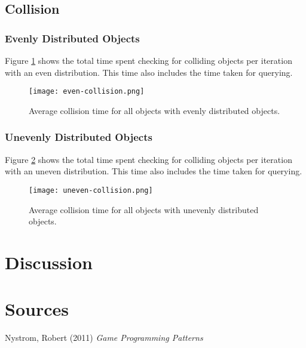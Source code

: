 \documentclass[a4paper, 12pt]{article}
\begin{document}
\subsection{Collision}

\subsubsection{Evenly Distributed Objects}
Figure \ref{fig:even-collision} shows the total time spent checking for
colliding objects per iteration with an even distribution. This time also
includes the time taken for querying.
\begin{figure}[H]
    \centering
    \caption{Average collision time for all objects with evenly distributed
    objects.}
    \texttt{[image: even-collision.png]}
    \label{fig:even-collision}
\end{figure}

\subsubsection{Unevenly Distributed Objects}
Figure \ref{fig:uneven-collision} shows the total time spent checking for
colliding objects per iteration with an uneven distribution. This time also
includes the time taken for querying.
\begin{figure}[H]
    \centering
    \caption{Average collision time for all objects with unevenly distributed
    objects.}
    \texttt{[image: uneven-collision.png]}
    \label{fig:uneven-collision}
\end{figure}

\section{Discussion}

\section{Sources}
Nystrom, Robert (2011) \textit{Game Programming Patterns}
\end{document}
